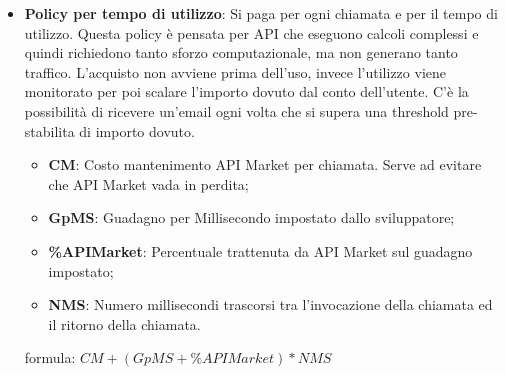 \begin{itemize}
	\item \textbf{Policy per tempo di utilizzo}: Si paga per ogni chiamata e per il tempo di utilizzo.
Questa policy \`{e} pensata per API che eseguono calcoli complessi e quindi richiedono tanto sforzo computazionale, ma non generano tanto traffico. L'acquisto non avviene prima dell'uso, invece l'utilizzo viene monitorato per poi scalare l'importo dovuto dal conto dell'utente. C'\`{e} la possibilit\`{a} di ricevere un'email ogni volta che si supera una threshold pre-stabilita di importo dovuto.
	
	\begin{itemize}
		\item \textbf{CM}: Costo mantenimento API Market per chiamata. Serve ad evitare che API Market vada in perdita;
		\item \textbf{GpMS}: Guadagno per Millisecondo impostato dallo sviluppatore;
		\item \textbf{\%APIMarket}: Percentuale trattenuta da API Market sul guadagno impostato;
		\item \textbf{NMS}: Numero millisecondi trascorsi tra l'invocazione della chiamata ed il ritorno della chiamata.
	\end{itemize}
	formula: $CM + (GpMS + \%APIMarket) * NMS
$
\end{itemize}

